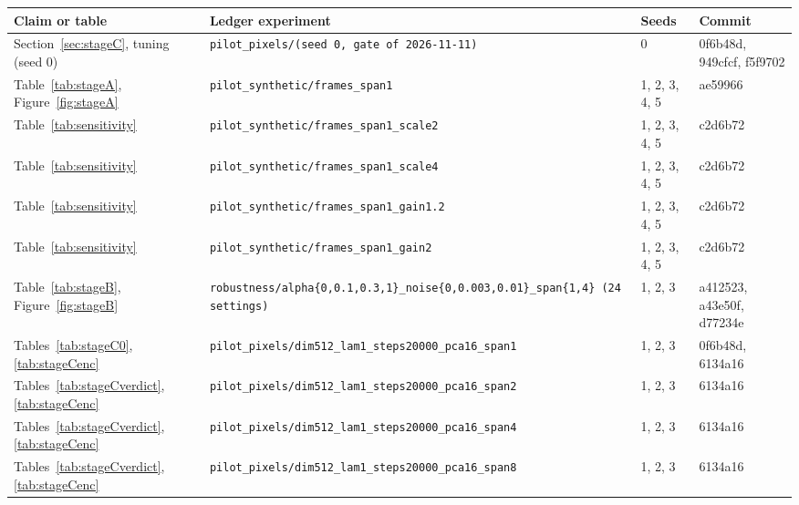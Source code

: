 \begin{longtable}{p{3.6cm}p{6.2cm}p{1.6cm}p{1.6cm}}\toprule
Claim or table & Ledger experiment & Seeds & Commit\\\midrule\endhead
Section~\ref{sec:stageC}, tuning (seed 0) & \texttt{pilot\_\allowbreak pixels/\allowbreak * (seed 0, gate of 2026-11-11)} & 0 & 0f6b48d, \allowbreak 949cfcf, \allowbreak f5f9702\\
Table~\ref{tab:stageA}, Figure~\ref{fig:stageA} & \texttt{pilot\_\allowbreak synthetic/\allowbreak frames\_\allowbreak span1} & 1, 2, 3, 4, 5 & ae59966\\
Table~\ref{tab:sensitivity} & \texttt{pilot\_\allowbreak synthetic/\allowbreak frames\_\allowbreak span1\_\allowbreak scale2} & 1, 2, 3, 4, 5 & c2d6b72\\
Table~\ref{tab:sensitivity} & \texttt{pilot\_\allowbreak synthetic/\allowbreak frames\_\allowbreak span1\_\allowbreak scale4} & 1, 2, 3, 4, 5 & c2d6b72\\
Table~\ref{tab:sensitivity} & \texttt{pilot\_\allowbreak synthetic/\allowbreak frames\_\allowbreak span1\_\allowbreak gain1.2} & 1, 2, 3, 4, 5 & c2d6b72\\
Table~\ref{tab:sensitivity} & \texttt{pilot\_\allowbreak synthetic/\allowbreak frames\_\allowbreak span1\_\allowbreak gain2} & 1, 2, 3, 4, 5 & c2d6b72\\
Table~\ref{tab:stageB}, Figure~\ref{fig:stageB} & \texttt{robustness/\allowbreak alpha\{0,0.1,0.3,1\}\_\allowbreak noise\{0,0.003,0.01\}\_\allowbreak span\{1,4\} (24 settings)} & 1, 2, 3 & a412523, \allowbreak a43e50f, \allowbreak d77234e\\
Tables~\ref{tab:stageC0}, \ref{tab:stageCenc} & \texttt{pilot\_\allowbreak pixels/\allowbreak dim512\_\allowbreak lam1\_\allowbreak steps20000\_\allowbreak pca16\_\allowbreak span1} & 1, 2, 3 & 0f6b48d, \allowbreak 6134a16\\
Tables~\ref{tab:stageCverdict}, \ref{tab:stageCenc} & \texttt{pilot\_\allowbreak pixels/\allowbreak dim512\_\allowbreak lam1\_\allowbreak steps20000\_\allowbreak pca16\_\allowbreak span2} & 1, 2, 3 & 6134a16\\
Tables~\ref{tab:stageCverdict}, \ref{tab:stageCenc} & \texttt{pilot\_\allowbreak pixels/\allowbreak dim512\_\allowbreak lam1\_\allowbreak steps20000\_\allowbreak pca16\_\allowbreak span4} & 1, 2, 3 & 6134a16\\
Tables~\ref{tab:stageCverdict}, \ref{tab:stageCenc} & \texttt{pilot\_\allowbreak pixels/\allowbreak dim512\_\allowbreak lam1\_\allowbreak steps20000\_\allowbreak pca16\_\allowbreak span8} & 1, 2, 3 & 6134a16\\

\end{longtable}
